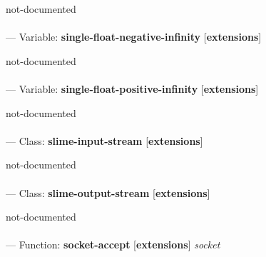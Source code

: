 \begin{adjustwidth}{5em}{5em}
not-documented
\end{adjustwidth}

\paragraph{}
\label{EXTENSIONS:SINGLE-FLOAT-NEGATIVE-INFINITY}
--- Variable: \textbf{single-float-negative-infinity} [\textbf{extensions}] \textit{}

\begin{adjustwidth}{5em}{5em}
not-documented
\end{adjustwidth}

\paragraph{}
\label{EXTENSIONS:SINGLE-FLOAT-POSITIVE-INFINITY}
--- Variable: \textbf{single-float-positive-infinity} [\textbf{extensions}] \textit{}

\begin{adjustwidth}{5em}{5em}
not-documented
\end{adjustwidth}

\paragraph{}
\label{EXTENSIONS:SLIME-INPUT-STREAM}
--- Class: \textbf{slime-input-stream} [\textbf{extensions}] \textit{}

\begin{adjustwidth}{5em}{5em}
not-documented
\end{adjustwidth}

\paragraph{}
\label{EXTENSIONS:SLIME-OUTPUT-STREAM}
--- Class: \textbf{slime-output-stream} [\textbf{extensions}] \textit{}

\begin{adjustwidth}{5em}{5em}
not-documented
\end{adjustwidth}

\paragraph{}
\label{EXTENSIONS:SOCKET-ACCEPT}
--- Function: \textbf{socket-accept} [\textbf{extensions}] \textit{socket}

